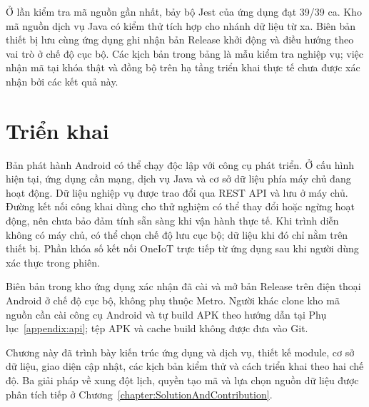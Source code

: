 \documentclass[../DoAn.tex]{subfiles}
\begin{document}
Ở lần kiểm tra mã nguồn gần nhất, bảy bộ Jest của ứng dụng đạt 39/39 ca. Kho mã nguồn dịch vụ Java có kiểm thử tích hợp cho nhánh dữ liệu từ xa. Biên bản thiết bị lưu cùng ứng dụng ghi nhận bản Release khởi động và điều hướng theo vai trò ở chế độ cục bộ. Các kịch bản trong bảng là mẫu kiểm tra nghiệp vụ; việc nhận mã tại khóa thật và đồng bộ trên hạ tầng triển khai thực tế chưa được xác nhận bởi các kết quả này.

\section{Triển khai}
Bản phát hành Android có thể chạy độc lập với công cụ phát triển. Ở cấu hình hiện tại, ứng dụng cần mạng, dịch vụ Java và cơ sở dữ liệu phía máy chủ đang hoạt động. Dữ liệu nghiệp vụ được trao đổi qua REST API và lưu ở máy chủ. Đường kết nối công khai dùng cho thử nghiệm có thể thay đổi hoặc ngừng hoạt động, nên chưa bảo đảm tính sẵn sàng khi vận hành thực tế. Khi trình diễn không có máy chủ, có thể chọn chế độ lưu cục bộ; dữ liệu khi đó chỉ nằm trên thiết bị. Phần khóa số kết nối OneIoT trực tiếp từ ứng dụng sau khi người dùng xác thực trong phiên.

Biên bản trong kho ứng dụng xác nhận đã cài và mở bản Release trên điện thoại Android ở chế độ cục bộ, không phụ thuộc Metro. Người khác clone kho mã nguồn cần cài công cụ Android và tự build APK theo hướng dẫn tại Phụ lục~\ref{appendix:api}; tệp APK và cache build không được đưa vào Git.

Chương này đã trình bày kiến trúc ứng dụng và dịch vụ, thiết kế module, cơ sở dữ liệu, giao diện cập nhật, các kịch bản kiểm thử và cách triển khai theo hai chế độ. Ba giải pháp về xung đột lịch, quyền tạo mã và lựa chọn nguồn dữ liệu được phân tích tiếp ở Chương~\ref{chapter:SolutionAndContribution}.
\end{document}
